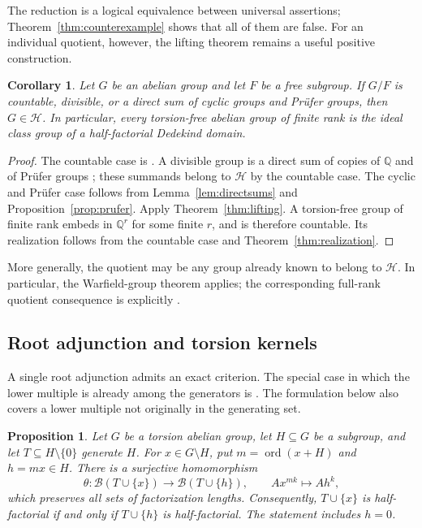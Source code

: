 \documentclass[11pt,reqno]{amsart}
\numberwithin{equation}{section}
\newtheorem{proposition}[theorem]{Proposition}
\newtheorem{corollary}[theorem]{Corollary}
\theoremstyle{definition}
\theoremstyle{remark}
\newcommand{\Q}{\mathbb Q}
\newcommand{\HF}{\mathcal H}
\newcommand{\B}{\mathcal B}
\DeclareMathOperator{\ord}{ord}
\begin{document}
The reduction is a logical equivalence between universal assertions;
Theorem~\ref{thm:counterexample} shows that all of them are false.
For an individual quotient, however, the lifting theorem remains
a useful positive construction.

\begin{corollary}\label{cor:classes}
Let $G$ be an abelian group and let $F$ be a free subgroup. If
$G/F$ is countable, divisible, or a direct sum of cyclic groups
and Pr\"ufer groups, then $G\in\HF$. In particular, every
torsion-free abelian group of finite rank is the ideal class group
of a half-factorial Dedekind domain.
\end{corollary}

\begin{proof}
The countable case is \cite[Theorem~5.3]{GeroldingerGoebel}.
A divisible group is a direct sum of copies of $\Q$ and of
Pr\"ufer groups \cite{Fuchs}; these summands belong to $\HF$ by
the countable case. The cyclic and Pr\"ufer case follows from
Lemma~\ref{lem:directsums} and Proposition~\ref{prop:prufer}.
Apply Theorem~\ref{thm:lifting}. A torsion-free group of finite
rank embeds in $\Q^r$ for some finite $r$, and is therefore
countable. Its realization follows from the countable case and
Theorem~\ref{thm:realization}.
\end{proof}

More generally, the quotient may be any group already known to
belong to $\HF$. In particular, the Warfield-group theorem
\cite[Theorem~5.1]{GeroldingerGoebel} applies; the corresponding
full-rank quotient consequence is explicitly
\cite[Corollary~5.2]{GeroldingerGoebel}. 

\subsection{Root adjunction and torsion kernels}

A single root adjunction admits an exact criterion. The special
case in which the lower multiple is already among the generators
is \cite[Proposition~3.3]{GeroldingerGoebel}. The formulation below
also covers a lower multiple not originally in the generating set.

\begin{proposition}\label{prop:root}
Let $G$ be a torsion abelian group, let $H\subseteq G$ be a subgroup,
and let $T\subseteq H\setminus\{0\}$ generate $H$. For
$x\in G\setminus H$, put $m=\ord(x+H)$ and $h=mx\in H$.
There is a surjective homomorphism
\[
 \theta:\B(T\cup\{x\})\longrightarrow\B(T\cup\{h\}),
 \qquad A x^{mk}\longmapsto A h^k,
\]
which preserves all sets of factorization lengths. Consequently,
$T\cup\{x\}$ is half-factorial if and only if $T\cup\{h\}$ is
half-factorial. The statement includes $h=0$.
\end{proposition}
\end{document}
